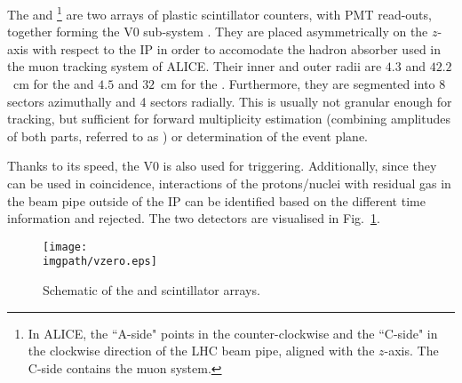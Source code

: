 The \VOA and \VOC\footnote{In ALICE, the ``A-side" points in the counter-clockwise and the ``C-side" in the clockwise direction of the LHC beam pipe, aligned with the $z$-axis. The C-side contains the muon system.} are two arrays of plastic scintillator counters, with PMT read-outs, together forming the V$0$ sub-system \cite{alicecollaborationPerformanceALICEVZERO2013}. They are placed asymmetrically on the $z$-axis with respect to the IP in order to accomodate the hadron absorber used in the muon tracking system of ALICE. Their inner and outer radii are $4.3$ and $42.2$~cm for the \VOA and $4.5$ and $32$~cm for the \VOC. Furthermore, they are segmented into 8 sectors azimuthally and 4 sectors radially. This is usually not granular enough for tracking, but sufficient for forward multiplicity estimation (combining amplitudes of both parts, referred to as \VOM) or determination of the event plane. 

Thanks to its speed, the V$0$ is also used for triggering. Additionally, since they can be used in coincidence, interactions of the protons/nuclei with residual gas in the beam pipe outside of the IP can be identified based on the different time information and rejected. The two detectors are visualised in Fig.~\ref{fig:alice:vzero}.

\begin{figure}[!h]
\texttt{[image: \\imgpath/vzero.eps]}\caption{Schematic of the \VOA and \VOC scintillator arrays. \cite{alicecollaborationPerformanceALICEVZERO2013}}
\label{fig:alice:vzero}
\end{figure}

